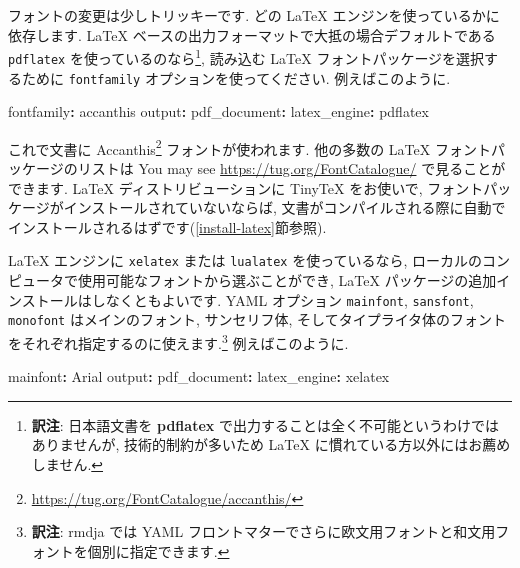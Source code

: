 \documentclass[
  11pt,
]{bxjsreport}
\newenvironment{Shaded}{\begin{snugshade}}{\end{snugshade}}
\newcommand{\AttributeTok}[1]{\textcolor[rgb]{0.77,0.63,0.00}{#1}}
\newcommand{\FunctionTok}[1]{\textcolor[rgb]{0.00,0.00,0.00}{#1}}
\newcommand{\KeywordTok}[1]{\textcolor[rgb]{0.13,0.29,0.53}{\textbf{#1}}}
\renewcommand{\href}[2]{#2\footnote{\url{#1}}}
\begin{document}
フォントの変更は少しトリッキーです. どの LaTeX エンジンを使っているかに依存します. LaTeX ベースの出力フォーマットで大抵の場合デフォルトである \texttt{pdflatex} を使っているのなら\footnote{\textbf{訳注}: 日本語文書を \textbf{pdflatex} で出力することは全く不可能というわけではありませんが, 技術的制約が多いため LaTeX に慣れている方以外にはお薦めしません.}, 読み込む LaTeX フォントパッケージを選択するために \texttt{fontfamily} オプションを使ってください. 例えばこのように.

\begin{Shaded}
\begin{Highlighting}[]
\FunctionTok{fontfamily}\KeywordTok{:}\AttributeTok{ accanthis}
\FunctionTok{output}\KeywordTok{:}
\AttributeTok{  }\FunctionTok{pdf\_document}\KeywordTok{:}\AttributeTok{ }
\AttributeTok{    }\FunctionTok{latex\_engine}\KeywordTok{:}\AttributeTok{ pdflatex}
\end{Highlighting}
\end{Shaded}

これで文書に \href{https://tug.org/FontCatalogue/accanthis/}{Accanthis} フォントが使われます. 他の多数の LaTeX フォントパッケージのリストは You may see \url{https://tug.org/FontCatalogue/} で見ることができます. LaTeX ディストリビューションに TinyTeX をお使いで, フォントパッケージがインストールされていないならば, 文書がコンパイルされる際に自動でインストールされるはずです(\ref{install-latex}節参照).

LaTeX エンジンに \texttt{xelatex} または \texttt{lualatex} を使っているなら, ローカルのコンピュータで使用可能なフォントから選ぶことができ, LaTeX パッケージの追加インストールはしなくともよいです. YAML オプション \texttt{mainfont}, \texttt{sansfont}, \texttt{monofont} はメインのフォント, サンセリフ体, そしてタイプライタ体のフォントをそれぞれ指定するのに使えます.\footnote{\textbf{訳注}: rmdja では YAML フロントマターでさらに欧文用フォントと和文用フォントを個別に指定できます.} 例えばこのように.

\begin{Shaded}
\begin{Highlighting}[]
\FunctionTok{mainfont}\KeywordTok{:}\AttributeTok{ Arial}
\FunctionTok{output}\KeywordTok{:}
\AttributeTok{  }\FunctionTok{pdf\_document}\KeywordTok{:}\AttributeTok{ }
\AttributeTok{    }\FunctionTok{latex\_engine}\KeywordTok{:}\AttributeTok{ xelatex}
\end{Highlighting}
\end{Shaded}
\end{document}
